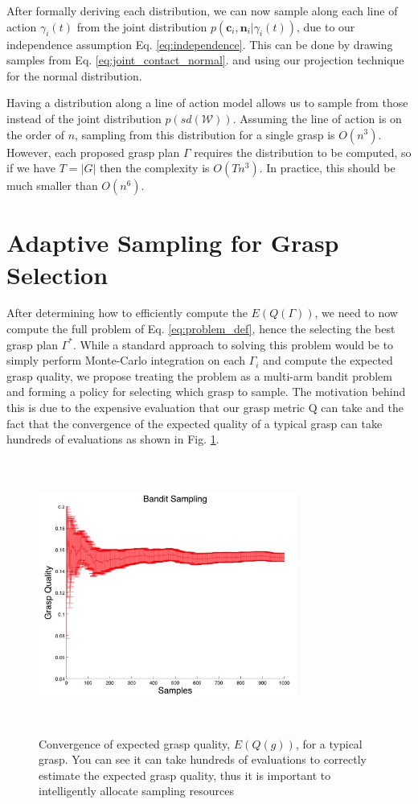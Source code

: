 \documentclass[letterpaper, 10 pt, conference]{ieeeconf}  %
\begin{document}
After formally deriving each distribution,  we can now sample along each line of action $\gamma_i(t)$ from the joint distribution $p(\textbf{c}_i,\textbf{n}_i | \gamma_i(t))$, due to our independence assumption Eq. \ref{eq:independence}. This can be done by drawing samples from Eq. \ref{eq:joint_contact_normal}. and using our projection technique for the normal distribution. 

Having a distribution along a line of action model allows us to sample from those instead of the joint distribution $p(sd(\mathcal{W}))$. Assuming the line of action is on the order of $n$, sampling from this distribution for a single grasp is $O(n^3)$. However, each proposed grasp plan $\Gamma$ requires the distribution to be computed, so if we have $T=|G|$ then the complexity is $O(Tn^3)$. In practice, this should be much smaller than $O(n^6)$. 

\section{Adaptive Sampling for Grasp Selection}
After determining how to efficiently compute the $E(Q(\Gamma))$, we need to now compute the full problem of Eq. \ref{eq:problem_def}, hence the selecting the best grasp plan $\Gamma^*$. While a standard approach to solving this problem would be to simply perform Monte-Carlo integration on each $\Gamma_i$ and compute the expected grasp quality, we propose treating the problem as a multi-arm bandit problem and forming a policy for selecting which grasp to sample. The motivation behind this is due to the expensive evaluation that our grasp metric Q can take \cite{ferrari1992} and the fact that the convergence of the expected quality of a typical grasp can take hundreds of evaluations as shown in Fig. \ref{fig:sampling_convergence}. 

\begin{figure}[ht!]
\centering
\includegraphics[width=8.5cm,height=9cm]{figures/Slide11.jpg}
\caption{ \footnotesize Convergence of expected grasp quality, $E(Q(g))$,  for a typical grasp. You can see it can take hundreds of evaluations to correctly estimate the expected grasp quality, thus it is important to  intelligently allocate sampling resources}
\vspace*{-10pt}
\label{fig:sampling_convergence}
\end{figure}
\end{document}
